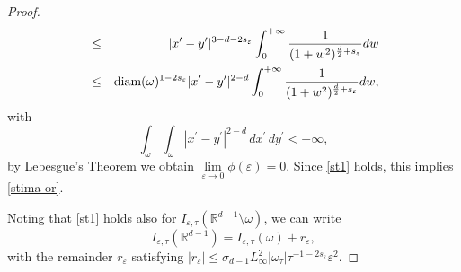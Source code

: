 \documentclass[11pt]{article}
\def\e{\varepsilon}
\begin{document}
\begin{proof}
\begin{eqnarray*}
&\leq&|x^\prime-y^\prime|^{3-d-2s_\e} \int_0^{+\infty}\frac{1}{(1+w^2)^{\frac{d}{2}+s_\e}} d w \\
&\leq&\hbox{\rm diam}(\omega)^{1-2s_\e} |x^\prime-y^\prime|^{2-d}\int_0^{+\infty}\frac{1}{(1+w^2)^{\frac{d}{2}+s_\e}} d w, 
\end{eqnarray*}
with
$$\int_{\omega}\int_{\omega}|x^\prime-y^\prime|^{2-d}\, dx^\prime\, dy^\prime<+\infty,$$ 
by Lebesgue's Theorem we obtain 
$\lim\limits_{\e\to 0}\phi(\e)=0$.
Since \eqref{st1} holds, this implies \eqref{stima-or}.

Noting that \eqref{st1} holds also for $I_{\e,\tau}(\mathbb R^{d-1}\setminus\omega)$, we can write
\begin{equation}\label{stima-semi}
I_{\e,\tau}(\mathbb R^{d-1})
= I_{\e,\tau}(\omega)+r_\e, 
\end{equation}
with the remainder $r_\e$ satisfying $|r_\e|\leq \sigma_{d-1}L^2_\infty |\omega_\tau|\tau^{-1-2s_\e}\e^2$. 


\end{proof}
\end{document}
